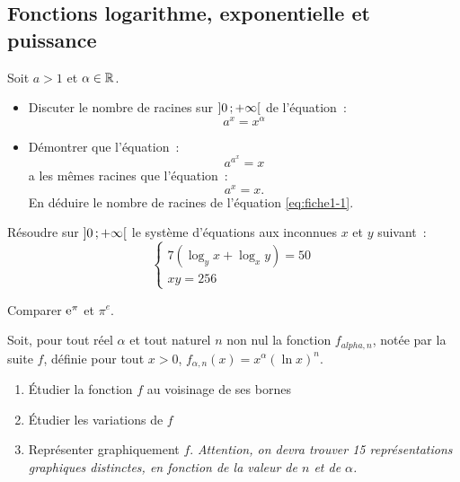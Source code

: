 \subsection{Fonctions logarithme, exponentielle et puissance}
\begin{exercice}
    Soit \(a > 1\) et \(\alpha \in \mathbb{R}\).
    \begin{itemize}
        \item Discuter le nombre de racines sur \(\left] 0 \, ;  +\infty \right[\) de l'équation~:
            \begin{equation}
                \label{eq:fiche1-1}
                a^x = x^\alpha
            \end{equation}
        \item Démontrer que l'équation~:
            \begin{equation}
                a^{a^x} = x
            \end{equation}
            a les mêmes racines que l'équation~:
            \begin{equation}
                a^x = x.
            \end{equation}
            En déduire le nombre de racines de l'équation \eqref{eq:fiche1-1}.
    \end{itemize}
\end{exercice}
\begin{exercice}
    Résoudre sur \(\left] 0 \, ;  +\infty \right[\) le système d'équations aux inconnues \(x\) et \(y\) suivant~:
    \begin{equation}
       \begin{cases} 7(\log_y x +\log_x y) = 50 \\ xy = 256 \end{cases} 
    \end{equation}
\end{exercice}
\begin{exercice}
    Comparer \(\operatorname{e}^\pi\) et \(\pi^e\).
\end{exercice}
\begin{exercice}
    Soit, pour tout réel \(\alpha\) et tout naturel \(n\) non nul la fonction \(f_{alpha, n}\), notée par la suite $f$, définie pour tout \(x>0\), \(f_{\alpha, n}(x) = x^\alpha (\ln x)^n \).
    \begin{enumerate}
        \item Étudier la fonction \(f\) au voisinage de ses bornes
        \item Étudier les variations de \(f\)
        \item Représenter graphiquement \(f\). \emph{Attention, on devra trouver 15 représentations graphiques distinctes, en fonction de la valeur de \(n\) et de \(\alpha\).}
    \end{enumerate}
\end{exercice}
